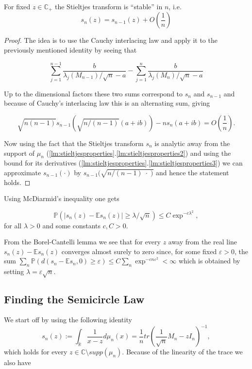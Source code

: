 \begin{lemma}
	For fixed $z\in\mathbb C_+$ the Stieltjes transform is ``stable'' in $n$, i.e.
	\begin{equation*}
		s_n(z)=s_{n-1}(z)+O\left(\frac{1}{n}\right)
	\end{equation*}
\end{lemma}
\begin{proof}
	The idea is to use the Cauchy interlacing law and apply it to the previously mentioned identity by seeing that
	
	$$\sum_{j=1}^{n-1}\frac{b}{\lambda_j(M_{n-1})/\sqrt{n}-a}-\sum_{j=1}^n\frac{b}{\lambda_j(M_n)/\sqrt{n}-a}$$
	
	Up to the dimensional factors these two sums correspond to $s_n$ and $s_{n-1}$ and because of Cauchy's interlacing law this is an alternating sum, giving
	
	$$\sqrt{n(n-1)}s_{n-1}(\sqrt{n/(n-1)}(a+ib))-ns_n(a+ib)=O\left(\frac{1}{n}\right).$$
	
	Now using the fact that the Stieltjes transform $s_n$ is analytic away from the support of $\mu_n$ (\ref{lm:stieltjesproperties}.\ref{lm:stieltjesproperties2}) and using the bound for its derivatives (\ref{lm:stieltjesproperties}.\ref{lm:stieltjesproperties3}) we can approximate $s_{n-1}(\cdot)$ by $s_{n-1}(\sqrt{n/(n-1) \;\cdot\; )}$ and hence the statement holds.
\end{proof}

Using McDiarmid's inequality one gets 

\begin{equation}\label{eq:concentrationOfStieltjesTransform}
	\mathbb P(|s_n(z)-\mathbb Es_n(z)|\geq\lambda/\sqrt n)\leq C\exp^{-c\lambda^2},
\end{equation}
 for all $\lambda>0$ and some constants $c,C>0$.

From the Borel-Cantelli lemma we see that for every $z$ away from the real line $s_n(z)-\mathbb Es_n(z)$ converges almost surely to zero since, for some fixed $\varepsilon>0$, the sum $\sum_n \mathbb P(d(s_n-\mathbb Es_n,0)\geq\varepsilon) \leq C\sum_n\exp^{-cn\varepsilon^2}<\infty$ which is obtained by setting $\lambda=\varepsilon\sqrt n$.

\subsection{Finding the Semicircle Law}

We start off by using the following identity $$s_n(z) := \int_\mathbb{R}\frac{1}{x-z}d\mu_n(x) = \frac{1}{n}tr\left(\frac{1}{\sqrt n}M_n-zI_n\right)^{-1},$$ which holds for every $z\in\mathbb C\setminus supp(\mu_n)$. Because of the linearity of the trace we also have

